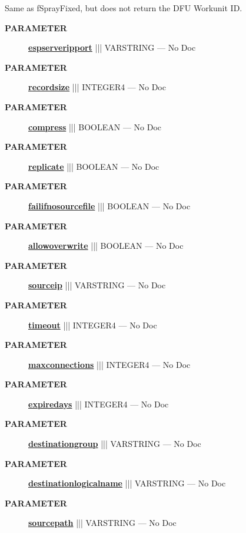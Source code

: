 \par





Same as fSprayFixed, but does not return the DFU Workunit ID.






\par
\begin{description}
\item [\colorbox{tagtype}{\color{white} \textbf{\textsf{PARAMETER}}}] \textbf{\underline{espserveripport}} ||| VARSTRING --- No Doc
\item [\colorbox{tagtype}{\color{white} \textbf{\textsf{PARAMETER}}}] \textbf{\underline{recordsize}} ||| INTEGER4 --- No Doc
\item [\colorbox{tagtype}{\color{white} \textbf{\textsf{PARAMETER}}}] \textbf{\underline{compress}} ||| BOOLEAN --- No Doc
\item [\colorbox{tagtype}{\color{white} \textbf{\textsf{PARAMETER}}}] \textbf{\underline{replicate}} ||| BOOLEAN --- No Doc
\item [\colorbox{tagtype}{\color{white} \textbf{\textsf{PARAMETER}}}] \textbf{\underline{failifnosourcefile}} ||| BOOLEAN --- No Doc
\item [\colorbox{tagtype}{\color{white} \textbf{\textsf{PARAMETER}}}] \textbf{\underline{allowoverwrite}} ||| BOOLEAN --- No Doc
\item [\colorbox{tagtype}{\color{white} \textbf{\textsf{PARAMETER}}}] \textbf{\underline{sourceip}} ||| VARSTRING --- No Doc
\item [\colorbox{tagtype}{\color{white} \textbf{\textsf{PARAMETER}}}] \textbf{\underline{timeout}} ||| INTEGER4 --- No Doc
\item [\colorbox{tagtype}{\color{white} \textbf{\textsf{PARAMETER}}}] \textbf{\underline{maxconnections}} ||| INTEGER4 --- No Doc
\item [\colorbox{tagtype}{\color{white} \textbf{\textsf{PARAMETER}}}] \textbf{\underline{expiredays}} ||| INTEGER4 --- No Doc
\item [\colorbox{tagtype}{\color{white} \textbf{\textsf{PARAMETER}}}] \textbf{\underline{destinationgroup}} ||| VARSTRING --- No Doc
\item [\colorbox{tagtype}{\color{white} \textbf{\textsf{PARAMETER}}}] \textbf{\underline{destinationlogicalname}} ||| VARSTRING --- No Doc
\item [\colorbox{tagtype}{\color{white} \textbf{\textsf{PARAMETER}}}] \textbf{\underline{sourcepath}} ||| VARSTRING --- No Doc
\end{description}







